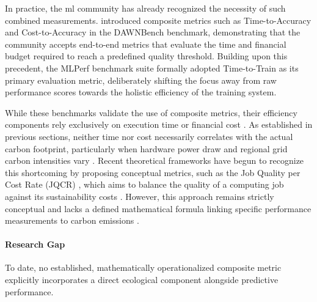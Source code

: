 In practice, the \gls{ml} community has already recognized the necessity of such combined measurements. \citeauthor{colemanAnalysisDAWNBenchTimetoAccuracy2019} \cite{colemanAnalysisDAWNBenchTimetoAccuracy2019} introduced composite metrics such as Time-to-Accuracy and Cost-to-Accuracy in the DAWNBench benchmark, demonstrating that the community accepts end-to-end metrics that evaluate the time and financial budget required to reach a predefined quality threshold. Building upon this precedent, the MLPerf benchmark suite \cite{mattsonMLPerfTrainingBenchmark2020} formally adopted Time-to-Train as its primary evaluation metric, deliberately shifting the focus away from raw performance scores towards the holistic efficiency of the training system.

While these benchmarks validate the use of composite metrics, their efficiency components rely exclusively on execution time or financial cost \parencite{colemanAnalysisDAWNBenchTimetoAccuracy2019, mattsonMLPerfTrainingBenchmark2020}. As established in previous sections, neither time nor cost necessarily correlates with the actual carbon footprint, particularly when hardware power draw and regional grid carbon intensities vary \cite{wrightEfficiencyNotEnough2025}. Recent theoretical frameworks have begun to recognize this shortcoming by proposing conceptual metrics, such as the Job Quality per Cost Rate (JQCR) \cite{eilamMethodologyFrameworkAI2023}, which aims to balance the quality of a computing job against its sustainability costs \cite{eilamMethodologyFrameworkAI2023}. However, this approach remains strictly conceptual and lacks a defined mathematical formula linking specific performance measurements to carbon emissions \cite{eilamMethodologyFrameworkAI2023}. 

\paragraph{Research Gap}
To date, no established, mathematically operationalized composite metric explicitly incorporates a direct ecological component alongside predictive performance.


